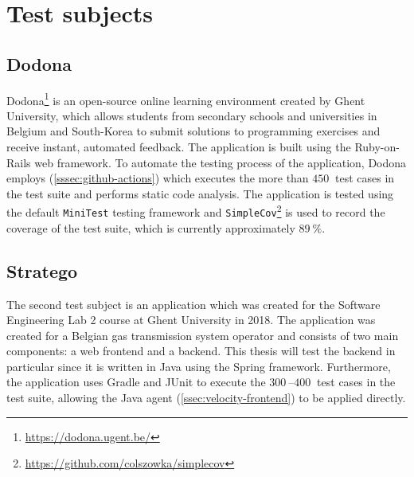 
\section{Test subjects}

\subsection{Dodona}
Dodona\footnote{\url{https://dodona.ugent.be/}} is an open-source online learning environment created by Ghent University, which allows students from secondary schools and universities in Belgium and South-Korea to submit solutions to programming exercises and receive instant, automated feedback. The application is built using the Ruby-on-Rails web framework. To automate the testing process of the application, Dodona employs \githubactions{} (\cref{sssec:github-actions}) which executes the more than $\SI{450}{}$ test cases in the test suite and performs static code analysis. The application is tested using the default \texttt{MiniTest} testing framework and \texttt{SimpleCov}\footnote{\url{https://github.com/colszowka/simplecov}} is used to record the coverage of the test suite, which is currently approximately $\SI{89}{\percent}$.

\subsection{Stratego}
The second test subject is an application which was created for the Software Engineering Lab 2 course at Ghent University in 2018. The application was created for a Belgian gas transmission system operator and consists of two main components: a web frontend and a backend. This thesis will test the backend in particular since it is written in Java using the Spring framework. Furthermore, the application uses Gradle and JUnit to execute the $\SIrange{300}{400}{}$ test cases in the test suite, allowing the Java agent (\cref{ssec:velocity-frontend}) to be applied directly.